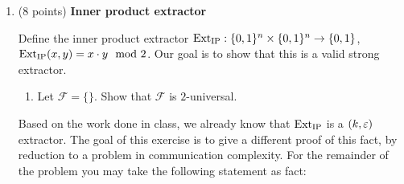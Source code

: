 \documentclass[12pt]{article}
\begin{document}
\begin{enumerate}
\item (8 points) {\bf Inner product extractor}

Define the inner product extractor $\mathrm{Ext}_{\mathrm{IP}}:\{0,1\}^n\times\{0,1\}^n\to\{0,1\}$, $\mathrm{Ext}_{\mathrm{IP}}(x,y)=x\cdot y\mod 2$. Our goal is to show that this is a valid strong extractor. 
\begin{enumerate}
\item Let $\mathcal{F}=\{\}$. Show that $\mathcal{F}$ is $2$-universal.
\end{enumerate}
Based on the work done in class, we already know that $\mathrm{Ext}_{\mathrm{IP}}$ is a $(k,\varepsilon)$ extractor. The goal of this exercise is to give a different proof of this fact, by reduction to a problem in communication complexity. For the remainder of the problem you may take the following statement as fact: 



\end{enumerate}
\end{document}
